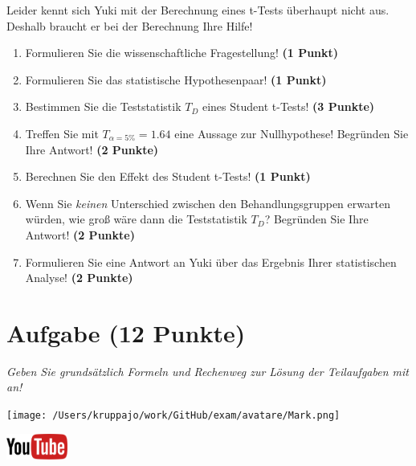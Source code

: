 \documentclass[a4paper, 9pt]{scrartcl}\usepackage[]{graphicx}\usepackage[]{xcolor}
\begin{document}
Leider kennt sich Yuki mit der Berechnung eines t-Tests überhaupt nicht aus. Deshalb braucht er bei der Berechnung Ihre Hilfe!

\begin{enumerate}
  \item Formulieren Sie die wissenschaftliche Fragestellung! \textbf{(1 Punkt)}
  \item Formulieren Sie das statistische Hypothesenpaar! \textbf{(1 Punkt)}
  \item Bestimmen Sie die Teststatistik $T_{D}$ eines Student t-Tests! \textbf{(3 Punkte)}
\item Treffen Sie mit $T_{\alpha = 5\%} = 1.64$ eine Aussage zur Nullhypothese! Begründen Sie Ihre Antwort! \textbf{(2 Punkte)}
\item Berechnen Sie den Effekt des Student t-Tests! \textbf{(1 Punkt)}
\item Wenn Sie \textit{keinen} Unterschied zwischen den Behandlungsgruppen erwarten würden, wie groß wäre dann die Teststatistik $T_{D}$? Begründen Sie Ihre Antwort! \textbf{(2 Punkte)}
\item Formulieren Sie eine Antwort an Yuki über das Ergebnis Ihrer statistischen Analyse! \textbf{(2 Punkte)}
\end{enumerate} 
\clearpage

\section{Aufgabe \hfill (12 Punkte)}

\textit{Geben Sie grundsätzlich Formeln und Rechenweg zur Lösung der Teilaufgaben mit an!} \\[1Ex]
 

 
\begin{minipage}[t]{0.5\textwidth}
\texttt{[image: /Users/kruppajo/work/GitHub/exam/avatare/Mark.png]}
\end{minipage}
\begin{minipage}[t]{0.5\textwidth}
\hfill
\href{https://youtu.be/TbSEOMCQYl4}{\includegraphics[width = 2cm]{img/youtube}}\\[1Ex]
\end{minipage}
\vspace{1ex}
\end{document}
